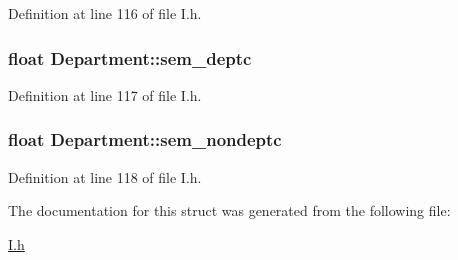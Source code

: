 \-Definition at line 116 of file \-I.\-h.

\hypertarget{structDepartment_a91bd3b56008efedba6776d6881c3486b}{
\subsubsection[{sem\-\_\-deptc}]{\setlength{\rightskip}{0pt plus 5cm}float {\bf \-Department\-::sem\-\_\-deptc}}}\label{structDepartment_a91bd3b56008efedba6776d6881c3486b}


\-Definition at line 117 of file \-I.\-h.

\hypertarget{structDepartment_a00f5ef8f8bd3d8514b41a9ea564ee205}{
\subsubsection[{sem\-\_\-nondeptc}]{\setlength{\rightskip}{0pt plus 5cm}float {\bf \-Department\-::sem\-\_\-nondeptc}}}\label{structDepartment_a00f5ef8f8bd3d8514b41a9ea564ee205}


\-Definition at line 118 of file \-I.\-h.



\-The documentation for this struct was generated from the following file\-:\begin{DoxyCompactItemize}
\item 
\hyperlink{I_8h}{\-I.\-h}\end{DoxyCompactItemize}
